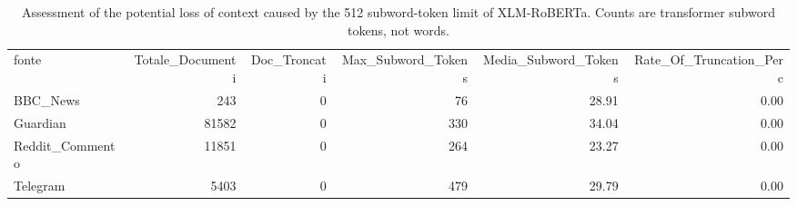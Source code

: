\begin{table}
\caption{Assessment of the potential loss of context caused by the 512 subword-token limit of XLM-RoBERTa. Counts are transformer subword tokens, not words.}
\label{tab:truncation_loss}
\begin{tabular}{lrrrrr}
fonte & Totale_Documenti & Doc_Troncati & Max_Subword_Tokens & Media_Subword_Tokens & Rate_Of_Truncation_Perc \\
BBC_News & 243 & 0 & 76 & 28.91 & 0.00 \\
Guardian & 81582 & 0 & 330 & 34.04 & 0.00 \\
Reddit_Commento & 11851 & 0 & 264 & 23.27 & 0.00 \\
Telegram & 5403 & 0 & 479 & 29.79 & 0.00 \\
\end{tabular}
\end{table}
